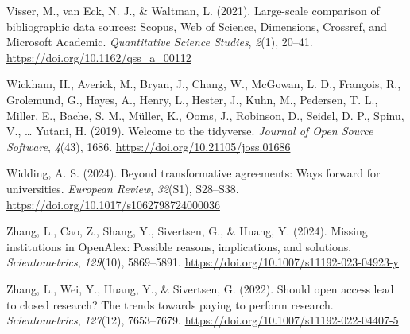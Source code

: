 \documentclass[a4paper,man,floatsintext,longtable,noextraspace,10pt]{apa6}
\newlength{\cslhangindent}
\newenvironment{CSLReferences}[2] %
{\begin{list}{}{%
  \setlength{\itemindent}{0pt}
  \setlength{\leftmargin}{0pt}
  \setlength{\parsep}{0pt}
  \ifodd #1
  \setlength{\leftmargin}{\cslhangindent}
  \setlength{\itemindent}{-1\cslhangindent}
  \fi
  \setlength{\itemsep}{#2\baselineskip}}}
{\end{list}}
\begin{document}
\begin{CSLReferences}{1}{0}
Visser, M., van Eck, N. J., \& Waltman, L. (2021). Large-scale
comparison of bibliographic data sources: {Scopus, Web of Science,
Dimensions, Crossref, and Microsoft Academic}. \emph{Quantitative
Science Studies}, \emph{2}(1), 20--41.
\url{https://doi.org/10.1162/qss_a_00112}

Wickham, H., Averick, M., Bryan, J., Chang, W., McGowan, L. D.,
François, R., Grolemund, G., Hayes, A., Henry, L., Hester, J., Kuhn, M.,
Pedersen, T. L., Miller, E., Bache, S. M., Müller, K., Ooms, J.,
Robinson, D., Seidel, D. P., Spinu, V., \ldots{} Yutani, H. (2019).
Welcome to the {tidyverse}. \emph{Journal of Open Source Software},
\emph{4}(43), 1686. \url{https://doi.org/10.21105/joss.01686}

Widding, A. S. (2024). Beyond transformative agreements: Ways forward
for universities. \emph{European Review}, \emph{32}(S1), S28--S38.
\url{https://doi.org/10.1017/s1062798724000036}

Zhang, L., Cao, Z., Shang, Y., Sivertsen, G., \& Huang, Y. (2024).
Missing institutions in OpenAlex: Possible reasons, implications, and
solutions. \emph{Scientometrics}, \emph{129}(10), 5869--5891.
\url{https://doi.org/10.1007/s11192-023-04923-y}

Zhang, L., Wei, Y., Huang, Y., \& Sivertsen, G. (2022). Should open
access lead to closed research? The trends towards paying to perform
research. \emph{Scientometrics}, \emph{127}(12), 7653--7679.
\url{https://doi.org/10.1007/s11192-022-04407-5}

\end{CSLReferences}
\end{document}
